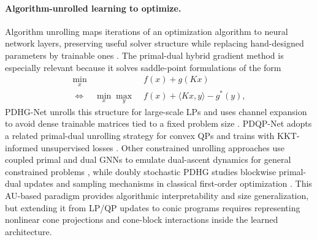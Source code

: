 \documentclass[10pt,twocolumn]{article}
\begin{document}
\paragraph{Algorithm-unrolled learning to optimize.}
Algorithm unrolling maps iterations of an optimization algorithm to neural network layers, preserving useful solver structure while replacing hand-designed parameters by trainable ones \citep{monga2021algorithm}.
The primal-dual hybrid gradient method \citep{chambolle2011primaldual} is especially relevant because it solves saddle-point formulations of the form
\begin{equation}
\begin{aligned}
    \min_x \; & f(x)+g(Kx) \\
    \Longleftrightarrow\quad
    \min_x\max_y \; & f(x)+\langle Kx,y\rangle-g^*(y),
\end{aligned}
    \label{eq:pdhg_saddle}
\end{equation}
PDHG-Net unrolls this structure for large-scale LPs and uses channel expansion to avoid dense trainable matrices tied to a fixed problem size \citep{li2024pdhgnet}.
PDQP-Net adopts a related primal-dual unrolling strategy for convex QPs and trains with KKT-informed unsupervised losses \citep{yang2024pdqpnet}.
Other constrained unrolling approaches use coupled primal and dual GNNs to emulate dual-ascent dynamics for general constrained problems \citep{hadou2025unrolledgnn}, while doubly stochastic PDHG studies blockwise primal-dual updates and sampling mechanisms in classical first-order optimization \citep{xiao2026dspdhg}.
This AU-based paradigm provides algorithmic interpretability and size generalization, but extending it from LP/QP updates to conic programs requires representing nonlinear cone projections and cone-block interactions inside the learned architecture.
\end{document}
